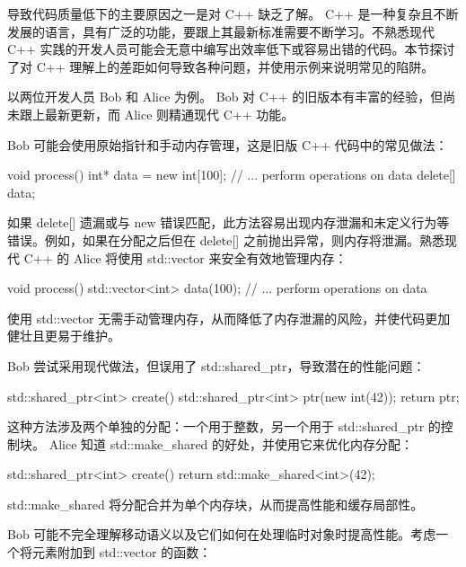
导致代码质量低下的主要原因之一是对 C++ 缺乏了解。 C++ 是一种复杂且不断发展的语言，具有广泛的功能，要跟上其最新标准需要不断学习。不熟悉现代 C++ 实践的开发人员可能会无意中编写出效率低下或容易出错的代码。本节探讨了对 C++ 理解上的差距如何导致各种问题，并使用示例来说明常见的陷阱。

以两位开发人员 Bob 和 Alice 为例。 Bob 对 C++ 的旧版本有丰富的经验，但尚未跟上最新更新，而 Alice 则精通现代 C++ 功能。


Bob 可能会使用原始指针和手动内存管理，这是旧版 C++ 代码中的常见做法：

\begin{cpp}
void process() {
    int* data = new int[100];
    // ... perform operations on data
    delete[] data;
}
\end{cpp}

如果 delete[] 遗漏或与 new 错误匹配，此方法容易出现内存泄漏和未定义行为等错误。例如，如果在分配之后但在 delete[] 之前抛出异常，则内存将泄漏。熟悉现代 C++ 的 Alice 将使用 std::vector 来安全有效地管理内存：

\begin{cpp}
void process() {
    std::vector<int> data(100);
    // ... perform operations on data
}
\end{cpp}

使用 std::vector 无需手动管理内存，从而降低了内存泄漏的风险，并使代码更加健壮且更易于维护。


Bob 尝试采用现代做法，但误用了 std::shared\_ptr，导致潜在的性能问题：

\begin{cpp}
std::shared_ptr<int> create() {
    std::shared_ptr<int> ptr(new int(42));
    return ptr;
}
\end{cpp}

这种方法涉及两个单独的分配：一个用于整数，另一个用于 std::shared\_ptr 的控制块。 Alice 知道 std::make\_shared 的好处，并使用它来优化内存分配：

\begin{cpp}
std::shared_ptr<int> create() {
    return std::make_shared<int>(42);
}
\end{cpp}

std::make\_shared 将分配合并为单个内存块，从而提高性能和缓存局部性。


Bob 可能不完全理解移动语义以及它们如何在处理临时对象时提高性能。考虑一个将元素附加到 std::vector 的函数：

